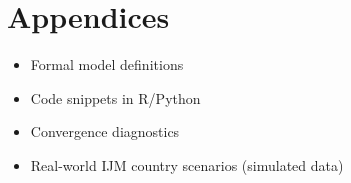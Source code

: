 \documentclass[
  12pt,
]{article}
\providecommand{\tightlist}{%
  \setlength{\itemsep}{0pt}\setlength{\parskip}{0pt}}\usepackage{longtable,booktabs,array}
\theoremstyle{plain}
\theoremstyle{definition}
\begin{document}
\newpage

\section*{Appendices}\label{appendices}

\begin{itemize}
\tightlist
\item
  Formal model definitions\\
\item
  Code snippets in R/Python\\
\item
  Convergence diagnostics\\
\item
  Real-world IJM country scenarios (simulated data)
\end{itemize}
\end{document}
